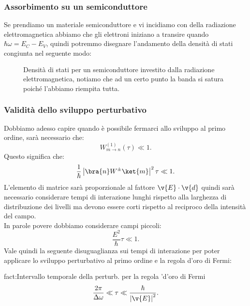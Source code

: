 \subsubsection{Assorbimento su un semiconduttore}%
\label{subsub:Assorbimento su un semiconduttore}
Se prendiamo un materiale semiconduttore e vi incidiamo con della radiazione elettromagnetica abbiamo che gli elettroni iniziano a transire quando $\hbar \omega= E_C-E_V$, quindi potremmo disegnare l'andamento della densità di stati congiunta nel seguente modo:
\begin{figure}[ht]
    \centering
    \caption{Densità di stati per un semiconduttore investito dalla radiazione elettromagnetica, notiamo che ad un certo punto la banda si satura poiché l'abbiamo riempita tutta.}
    \label{fig:densità-di-stati-per-un-semiconduttore-investito-dalla-radiazione-elettromagnetica}
\end{figure}
\subsubsection{Validità dello sviluppo perturbativo}%
Dobbiamo adesso capire quando è possibile fermarci allo sviluppo al primo ordine, sarà necessario che:
\[
    W^{(1) }_{m\to n}(\tau) \ll 1
.\] 
Questo significa che:
\[
\frac{1}{\hbar }\left|\bra{n}W^{\pm} \ket{m}\right|^2\tau \ll 1
.\] 
L'elemento di matrice sarà proporzionale al fattore $\v{E}\cdot \v{d}$ quindi sarà necessario considerare tempi di interazione lunghi rispetto alla larghezza di distribuzione dei livelli ma devono essere corti rispetto al reciproco della intensità del campo.\\
In parole povere dobbiamo considerare campi piccoli:
\[
     \frac{E^2}{\hbar}\tau  \ll 1
.\] 
Vale quindi la seguente disuguaglianza sui tempi di interazione per poter applicare lo sviluppo perturbativo al primo ordine e la regola d'oro di Fermi:
\begin{fact}{fact:Intervallo temporale della perturb. per la regola 'd'oro di Fermi}
\[
    \frac{2\pi}{\Delta\omega}\ll \tau\ll \frac{\hbar }{\left|\v{E}\right|^2}
.\] 
\end{fact}
